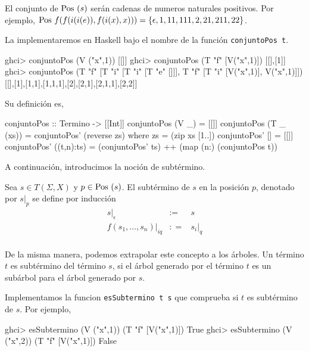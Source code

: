 El conjunto de $\mbox{Pos }(s)$ serán cadenas de numeros naturales
positivos. Por ejemplo,
$\mbox{Pos } f(f(i(i(e)),f(i(x),x))) = \{ \epsilon,1,11,111,2,21,211,22 \}$.

La implementaremos en Haskell bajo el nombre de la función \texttt{conjuntoPos t}.

\begin{sesion}
ghci> conjuntoPos (V ("x",1))
[[]]
ghci> conjuntoPos (T "f" [V("x",1)])
[[],[1]]
ghci> conjuntoPos (T "f" [T "i" [T "i" [T "e" []]],
                   T "f" [T "i" [V("x",1)], V("x",1)]])
[[],[1],[1,1],[1,1,1],[2],[2,1],[2,1,1],[2,2]]
\end{sesion}

Su definición es,

\begin{codigo}
conjuntoPos :: Termino -> [[Int]]
conjuntoPos (V _) = [[]]
conjuntoPos (T _ (xs)) = conjuntoPos' (reverse zs)
    where zs = (zip xs [1..])
          conjuntoPos' [] = [[]]
          conjuntoPos' ((t,n):ts) = (conjuntoPos' ts) ++ 
                                    (map (n:) (conjuntoPos t))
\end{codigo}


A continuación, introducimos la noción de subtérmino.
\begin{defi}
  Sea $s \in T(\Sigma, X)$ y $p \in \mbox{Pos } (s)$. El subtérmino de $s$ en
  la posición $p$, denotado por $s|_p$ se define por inducción
  \begin{equation*}
    \begin{array}{rcl}
      s|_\epsilon & :=  & s \\
      f(s_1,\dots,s_n)|_{iq} & : = & s_i|_q \\
    \end{array}
  \end{equation*}
\end{defi}

De la misma manera, podemos extrapolar este concepto a los árboles. Un
término $t$ es subtérmino del término $s$, si el árbol generado por el
término $t$ es un subárbol para el árbol generado por $s$. 

Implementamos la funcion \texttt{esSubtermino t s} que comprueba si $t$ es
subtérmino de $s$. Por ejemplo,

\begin{sesion}
ghci> esSubtermino (V ("x",1)) (T "f" [V("x",1)])
True
ghci> esSubtermino (V ("x",2)) (T "f" [V("x",1)])
False
\end{sesion}

